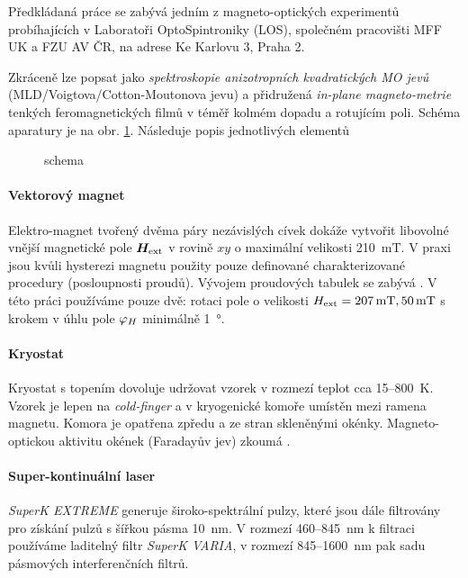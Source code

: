 Předkládaná práce se zabývá jedním z magneto-optických experimentů probíhajících v Laboratoři OptoSpintroniky (LOS), společném pracovišti MFF UK a FZU AV ČR, na adrese Ke Karlovu 3, Praha 2.

Zkráceně lze popsat jako \emph{spektroskopie anizotropních kvadratických MO jevů} (MLD/Voigtova/Cotton-Moutonova jevu) a přidružená \emph{in-plane magneto-metrie} tenkých feromagnetických filmů v téměř kolmém dopadu a rotujícím poli.
Schéma aparatury je na obr. \ref{fig:zakladni-schema}.
Následuje popis jednotlivých elementů

\begin{figure}[htbp]
    \centering
    
    \caption{schema}
    \label{fig:zakladni-schema}
\end{figure}

\paragraph{Vektorový magnet}
Elektro-magnet tvořený dvěma páry nezávislých cívek dokáže vytvořit libovolné vnější magnetické pole $\bm{H}_\textrm{ext}$ v rovině $xy$ o maximální velikosti \SI{210}{\milli\tesla}.
V praxi jsou kvůli hysterezi magnetu použity pouze definované charakterizované procedury (posloupnosti proudů).
Vývojem proudových tabulek se zabývá \cite{kimakCharakterizaciaDvojdimenzionalnehoElektromagnetu2017,kimakOptickaSpektroskopieAntiferomagnetu2019}.
V této práci používáme pouze dvě: rotaci pole o velikosti $H_\textrm{ext}=\SI{207}{\milli\tesla}, \SI{50}{\milli\tesla}$ s krokem v úhlu pole $\varphi_H$ minimálně \SI{1}{\degree}.

\paragraph{Kryostat}
Kryostat s topením dovoluje udržovat vzorek v rozmezí teplot cca 15--\SI{800}{\kelvin}.
Vzorek je lepen na \emph{cold-finger} a v kryogenické komoře umístěn mezi ramena magnetu.
Komora je opatřena zpředu a ze stran skleněnými okénky.
Magneto-optickou aktivitu okének (Faradayův jev) zkoumá \cite{baduraMagnetooptickaMereniPro2019}.

\paragraph{Super-kontinuální laser}
\emph{SuperK EXTREME} generuje široko-spektrální pulzy, které jsou dále filtrovány pro získání pulzů s šířkou pásma \SI{10}{\nano\meter}.
V rozmezí \num{460}--\SI{845}{\nano\meter} k filtraci používáme laditelný filtr \emph{SuperK VARIA}, v rozmezí \num{845}--\SI{1600}{\nano\meter} pak sadu pásmových interferenčních filtrů.

